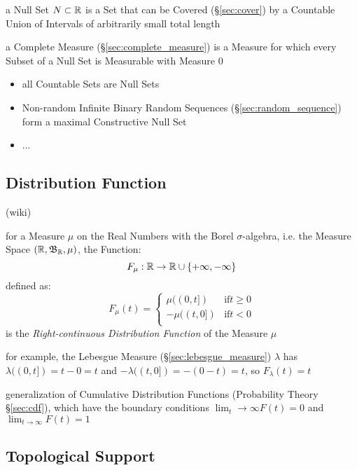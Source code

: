 a Null Set $N \subset \mathbb{R}$ is a Set that can be Covered (\S\ref{sec:cover})
by a Countable Union of Intervals of arbitrarily small total length

a Complete Measure (\S\ref{sec:complete_measure}) is a Measure for which every
Subset of a Null Set is Measurable with Measure $0$

\begin{itemize}
  \item all Countable Sets are Null Sets
  \item Non-random Infinite Binary Random Sequences
    (\S\ref{sec:random_sequence}) form a maximal Constructive Null Set
  \item ...
\end{itemize}



\subsection{Distribution Function}\label{sec:distribution_function}

(wiki)

for a Measure $\mu$ on the Real Numbers with the Borel $\sigma$-algebra, i.e.
the Measure Space $(\mathbb{R}, \mathfrak{B}_{\mathbb{R}}, \mu)$, the Function:
\[
  F_\mu : \mathbb{R} \rightarrow \mathbb{R} \cup \{+\infty, -\infty\}
\]
defined as:
\[
  F_\mu(t) = \begin{cases}
     \mu((0,t]) & \text{if} t \geq 0 \\
    -\mu((t,0]) & \text{if} t < 0 \\
  \end{cases}
\]
is the \emph{Right-continuous Distribution Function} of the Measure $\mu$

for example, the Lebesgue Measure (\S\ref{sec:lebesgue_measure}) $\lambda$ has
$\lambda((0,t]) = t - 0 = t$ and $-\lambda((t,0]) = -(0 - t) = t$, so
$F_\lambda(t) = t$

generalization of Cumulative Distribution Functions (Probability Theory
\S\ref{sec:cdf}), which have the boundary conditions
$\lim_t\rightarrow\infty F(t) = 0$ and $\lim_{t\rightarrow\infty}F(t) = 1$



\subsection{Topological Support}\label{sec:topological_support}

